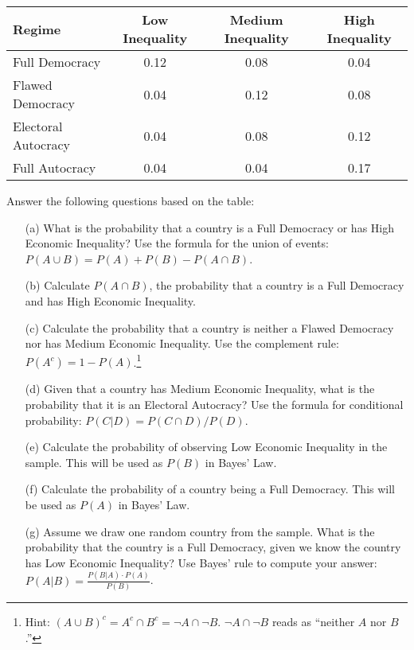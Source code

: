 \documentclass{article}
\begin{document}
\begin{table}[ht]
\centering
\begin{tabular}{|l|c|c|c|}
\hline
\textbf{Regime} & \textbf{Low Inequality} & \textbf{Medium Inequality} & \textbf{High Inequality} \\
\hline
Full Democracy & 0.12 & 0.08 & 0.04 \\
Flawed Democracy & 0.04 & 0.12 & 0.08 \\
Electoral Autocracy & 0.04 & 0.08 & 0.12 \\
Full Autocracy & 0.04 & 0.04 & 0.17 \\
\hline
\end{tabular}
\end{table}

Answer the following questions based on the table:

\begin{enumerate}
    \item[(a)] What is the probability that a country is a Full Democracy or has High Economic Inequality? Use the formula for the union of events: \( P(A \cup B) = P(A) + P(B) - P(A \cap B) \).
    \item[(b)] Calculate \( P(A \cap B) \), the probability that a country is a Full Democracy and has High Economic Inequality.
    \item[(c)] Calculate the probability that a country is neither a Flawed Democracy nor has Medium Economic Inequality. Use the complement rule: \( P(A^c) = 1 - P(A) \).\footnote{Hint: $(A \cup B)^c = A^c \cap B^c = \neg A \cap \neg B$. $\neg A \cap \neg B$ reads as ``neither $A$ nor $B$.''}
    \item[(d)] Given that a country has Medium Economic Inequality, what is the probability that it is an Electoral Autocracy? Use the formula for conditional probability: \( P(C|D) = P(C \cap D) / P(D) \).
    \item[(e)] Calculate the probability of observing Low Economic Inequality in the sample. This will be used as \( P(B) \) in Bayes' Law.
    \item[(f)] Calculate the probability of a country being a Full Democracy. This will be used as \( P(A) \) in Bayes' Law.
    \item[(g)] Assume we draw one random country from the sample. What is the probability that the country is a Full Democracy, given we know the country has Low Economic Inequality? Use Bayes' rule to compute your answer: \( P(A | B) = \frac{P(B | A) \cdot P(A)}{P(B)}  \).
\end{enumerate}
\end{document}
